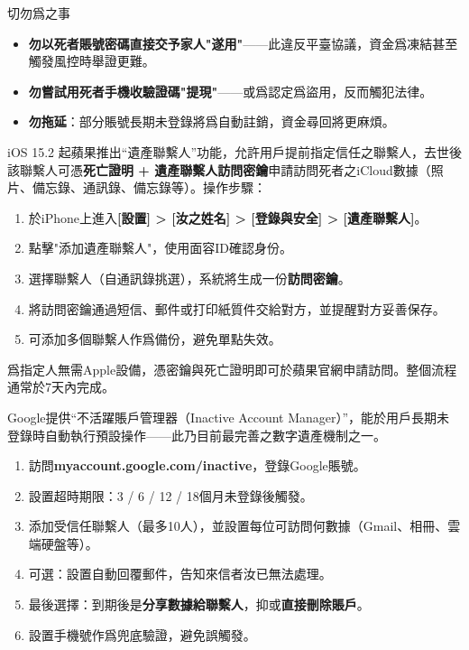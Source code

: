 \begin{tcbwarn}{切勿爲之事}
\begin{itemize}
  \item \textbf{勿以死者賬號密碼直接交予家人"遂用"}——此違反平臺協議，資金爲凍結甚至觸發風控時舉證更難。
  \item \textbf{勿嘗試用死者手機收驗證碼"提現"}——或爲認定爲盜用，反而觸犯法律。
  \item \textbf{勿拖延}：部分賬號長期未登錄將爲自動註銷，資金尋回將更麻煩。
\end{itemize}

\end{tcbwarn}


iOS 15.2 起蘋果推出“遺產聯繫人”功能，允許用戶提前指定信任之聯繫人，去世後該聯繫人可憑\textbf{死亡證明 + 遺產聯繫人訪問密鑰}申請訪問死者之iCloud數據（照片、備忘錄、通訊錄、備忘錄等）。操作步驟：

\begin{enumerate}
  \item 於iPhone上進入\textbf{[設置] > [汝之姓名] > [登錄與安全] > [遺產聯繫人]}。
  \item 點擊"添加遺產聯繫人"，使用面容ID確認身份。
  \item 選擇聯繫人（自通訊錄挑選），系統將生成一份\textbf{訪問密鑰}。
  \item 將訪問密鑰通過短信、郵件或打印紙質件交給對方，並提醒對方妥善保存。
  \item 可添加多個聯繫人作爲備份，避免單點失效。
\end{enumerate}

爲指定人無需Apple設備，憑密鑰與死亡證明即可於蘋果官網申請訪問。整個流程通常於7天內完成。


Google提供“不活躍賬戶管理器（Inactive Account Manager）”，能於用戶長期未登錄時自動執行預設操作——此乃目前最完善之數字遺產機制之一。

\begin{enumerate}
  \item 訪問\textbf{myaccount.google.com/inactive}，登錄Google賬號。
  \item 設置超時期限：3 / 6 / 12 / 18個月未登錄後觸發。
  \item 添加受信任聯繫人（最多10人），並設置每位可訪問何數據（Gmail、相冊、雲端硬盤等）。
  \item 可選：設置自動回覆郵件，告知來信者汝已無法處理。
  \item 最後選擇：到期後是\textbf{分享數據給聯繫人}，抑或\textbf{直接刪除賬戶}。
  \item 設置手機號作爲兜底驗證，避免誤觸發。
\end{enumerate}

